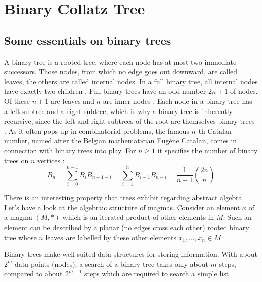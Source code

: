 \chapter{Binary Collatz Tree}
\label{ch:binary_tree}

\section{Some essentials on binary trees}
A binary tree is a rooted tree, where each node has at most two immediate successors. Those nodes, from which no edge goes out downward, are called leaves, the others are called internal nodes. In a full binary tree, all internal nodes have exactly two children \cite[p.~102]{Ref_Higham_2015}. Full binary trees have an odd number $2n+1$ of nodes. Of these $n+1$ are leaves and $n$ are inner nodes \cite[p.~134]{Ref_Kersting_Wakolbinger_2008}. Each node in a binary tree has a left subtree and a right subtree, which is why a binary tree is inherently recursive, since the left and right subtrees of the root are themselves binary trees \cite[p.~246-247]{Ref_Mazur_2010}. As it often pops up in combinatorial problems, the famous $n$-th Catalan number, named after the Belgian mathematician Eugène Catalan, comes in connection with binary trees into play. For $n\ge1$ it specifies the number of binary trees on $n$ vertices \cite[p.~247]{Ref_Mazur_2010}:
\[
B_n=\sum_{i=0}^{n-1}B_iB_{n-1-i}=\sum_{i=1}^{n}B_{i-1}B_{n-i}=\frac{1}{n+1}\binom{2n}{n}
\]

There is an interesting property that trees exhibit regarding abstract algebra. Let's have a look at the algebraic structure of magmas. Consider an element $x$ of a magma $(M,*)$ which is an iterated product of other elements in $M$. Such an element can be described by a planar (no edges cross each other) rooted binary tree whose $n$ leaves are labelled by these other elements $x_1,\ldots,x_n\in M$ \cite[p.~96]{Ref_Kalka_2016}.

Binary trees make well-suited data structures for storing information. With about $2^m$ data points (nodes), a search of a binary tree takes only about $m$ steps, compared to about $2^{m-1}$ steps which are required to search a simple list \cite[p.~84]{Ref_Benjamin_2009}.

